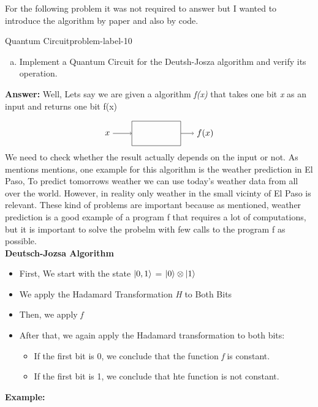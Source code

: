 For the following problem it was not required to answer but I wanted to introduce the algorithm by paper and also by code.
\begin{problem}{Quantum Circuit}{problem-label-10}
	
	\begin{enumerate}[(a)]
		\item Implement a Quantum Circuit for the Deutsh-Josza algorithm and verify its operation.
	\end{enumerate}
	\textbf{Answer:}
	Well, Lets say we are given a algorithm \textit{f(x)} that takes one bit \textit{x} as an input and returns one bit f(x)
	
	
\[
\begin{tikzpicture}[node distance=2cm, auto]
	\node (input) {$x$};
	\node[draw, rectangle, minimum width=2cm, minimum height=1cm, right of=input] (blackbox) {};
	\node[right of=blackbox] (output) {$f(x)$};
	\draw[-> ] (input) -- (blackbox);
	\draw[-> ] (blackbox) -- (output);
\end{tikzpicture}
\]
We need to check whether the result actually depends on the input or not. As mentions \cite{Kosheleva2021} mentions, one example for this algorithm is the weather prediction in El Paso, To predict tomorrows weather we can use today's weather data from all over the world. However, in reality only weather in the small vicinty of El Paso is relevant. These kind of problems are important because as mentioned, weather prediction is a good example of a program f that requires a lot of computations, but it is important to solve the probelm with few calls to the program f as possible.\\


\textbf{Deutsch-Jozsa Algorithm}
\begin{itemize}[]
	\item First, We start with the state $\ket{0,1}$ = $\ket{0}\otimes\ket{1}$
	\item We apply the Hadamard Transformation \textit{H} to Both Bits
	\item Then, we apply \textit{f}
	\item After that, we again apply the Hadamard transformation to both bits:
	\begin{itemize}[]
		\item If the first bit is 0, we conclude that the function \textit{f} is constant.
		\item If the first bit is 1, we conclude that hte function is not constant.
		\end{itemize}
\end{itemize}
\textbf{Example:}\\


\end{problem}
